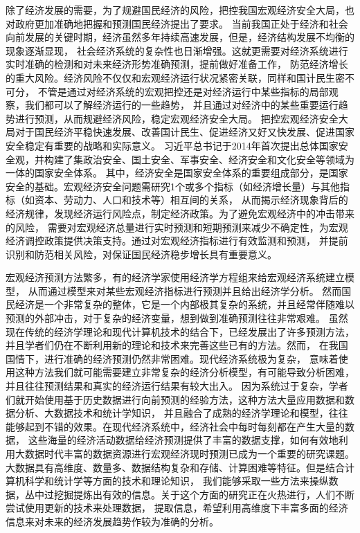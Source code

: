 除了经济发展的需要，为了规避国民经济的风险，把控我国宏观经济安全大局，也对政府更加准确地把握和预测国民经济提出了要求。
当前我国正处于经济和社会向前发展的关键时期，经济虽然多年持续高速发展，但是，经济结构发展不均衡的现象逐渐显现，
社会经济系统的复杂性也日渐增强。这就更需要对经济系统进行实时准确的检测和对未来经济形势准确预测，提前做好准备工作，
防范经济增长的重大风险。经济风险不仅仅和宏观经济运行状况紧密关联，同样和国计民生密不可分，
不管是通过对经济系统的宏观把控还是对经济运行中某些指标的局部观察，我们都可以了解经济运行的一些趋势，
并且通过对经济中的某些重要运行趋势进行预测，从而规避经济风险，稳定宏观经济安全大局。
把控宏观经济安全大局对于国民经济平稳快速发展、改善国计民生、促进经济又好又快发展、促进国家安全稳定有重要的战略和实际意义。
习近平总书记于2014年首次提出总体国家安全观，并构建了集政治安全、国土安全、军事安全、经济安全和文化安全等领域为一体的国家安全体系。
其中，经济安全是国家安全体系的重要组成部分，是国家安全的基础。宏观经济安全问题需研究1个或多个指标（如经济增长量）与其他指标（如资本、劳动力、人口和技术等）相互间的关系，
从而揭示经济现象背后的经济规律，发现经济运行风险点，制定经济政策。为了避免宏观经济中的冲击带来的风险，
需要对宏观经济总量进行实时预测和短期预测来减少不确定性，为宏观经济调控政策提供决策支持。通过对宏观经济指标进行有效监测和预测，
并提前识别和防范相关风险，对保证国民经济稳步增长具有重要意义。

宏观经济预测方法繁多，有的经济学家使用经济学方程组来给宏观经济系统建立模型，
从而通过模型来对某些宏观经济指标进行预测并且给出经济学分析。
然而国民经济是一个非常复杂的整体，它是一个内部极其复杂的系统，并且经常伴随难以预测的外部冲击，对于复杂的经济变量，想到做到准确预测往往非常艰难。
虽然现在传统的经济学理论和现代计算机技术的结合下，已经发展出了许多预测方法，并且学者们仍在不断利用新的理论和技术来完善这些已有的方法。然而，
在我国国情下，进行准确的经济预测仍然非常困难。现代经济系统极为复杂，
意味着使用这种方法我们就可能需要建立非常复杂的经济分析模型，有可能导致分析困难，并且往往预测结果和真实的经济运行结果有较大出入。
因为系统过于复杂，学者们就开始使用基于历史数据进行向前预测的经验方法，这种方法大量应用数据和数据分析、大数据技术和统计学知识，
并且融合了成熟的经济学理论和模型，往往能够起到不错的效果。在现代经济系统中，经济社会中每时每刻都在产生大量的数据，
这些海量的经济活动数据给经济预测提供了丰富的数据支撑，如何有效地利用大数据时代丰富的数据资源进行宏观经济现时预测已成为一个重要的研究课题。
大数据具有高维度、数量多、数据结构复杂和存储、计算困难等特征。但是结合计算机科学和统计学等方面的技术和理论知识，
我们能够采取一些方法来操纵数据，丛中过挖掘提炼出有效的信息。关于这个方面的研究正在火热进行，人们不断尝试使用更新的技术来处理数据，
提取信息，希望利用高维度下丰富多面的经济信息来对未来的经济发展趋势作较为准确的分析。

